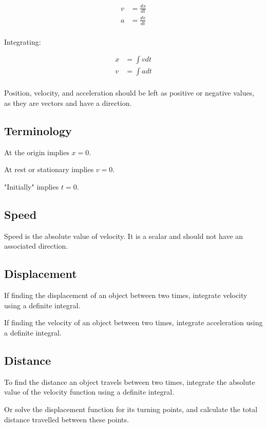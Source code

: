\documentclass[a4paper,11pt]{article}
\begin{document}
$$
\begin{aligned}
v & = \frac{dx}{dt} \\
a & = \frac{dv}{dt} \\
\end{aligned}
$$

Integrating:

$$
\begin{aligned}
x & = \int v dt \\
v & = \int a dt \\
\end{aligned}
$$

Position, velocity, and acceleration should be left as positive or negative
values, as they are vectors and have a direction.


\subsection{Terminology}

At the origin implies $x = 0$.

At rest or stationary implies $v = 0$.

"Initially" implies $t = 0$.


\subsection{Speed}

Speed is the absolute value of velocity. It is a scalar and should not have an
associated direction.


\subsection{Displacement}

If finding the displacement of an object between two times, integrate velocity
using a definite integral.

If finding the velocity of an object between two times, integrate acceleration
using a definite integral.


\subsection{Distance}

To find the distance an object travels between two times, integrate the absolute
value of the velocity function using a definite integral.

Or solve the displacement function for its turning points, and calculate the
total distance travelled between these points.
\end{document}
